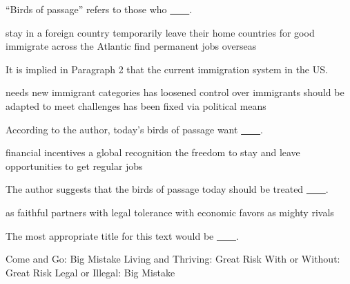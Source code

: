 \item ``Birds of passage'' refers to those who \uline{~~~~}.
\begin{tasks}
	\task stay in a foreign country temporarily
	\task leave their home countries for good
	\task immigrate across the Atlantic
	\task find permanent jobs overseas
\end{tasks}
\item It is implied in Paragraph 2 that the current immigration system in the US.
\begin{tasks}
	\task needs new immigrant categories
	\task has loosened control over immigrants
	\task should be adapted to meet challenges
	\task has been fixed via political means
\end{tasks}
\item According to the author, today's birds of passage want \uline{~~~~}.
\begin{tasks}
	\task financial incentives
	\task a global recognition
	\task the freedom to stay and leave
	\task opportunities to get regular jobs
\end{tasks}
\item The author suggests that the birds of passage today should be treated \uline{~~~~}.
\begin{tasks}
	\task as faithful partners
	\task with legal tolerance
	\task with economic favors
	\task as mighty rivals
\end{tasks}
\item The most appropriate title for this text would be \uline{~~~~}.
\begin{tasks}
	\task Come and Go: Big Mistake
	\task Living and Thriving: Great Risk
	\task With or Without: Great Risk
	\task Legal or Illegal: Big Mistake
\end{tasks}